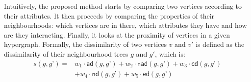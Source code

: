 Intuitively, the proposed method starts by comparing two vertices according to their attributes.
It then proceeds by comparing the properties of their neighbourhoods: which vertices are in there, which attributes they have and how are they interacting. 
Finally, it looks at the proximity of vertices in a given hypergraph.
Formally, the dissimilarity of two vertices $v$ and $v'$ is defined as the dissimilarity of their neighbourhood trees $g$ and $g'$, which is:
\begin{equation}
\label{eq:Sim}
\begin{split}
s(g,g’) = & w_1 \cdot \mathsf{ad}(g,g’) + w_2 \cdot \mathsf{nad}(g,g’) + w_3 \cdot \mathsf{cd}(g,g’) \\
     & + w_4 \cdot \mathsf{nd}(g,g’) + w_5 \cdot \mathsf{ed}(g,g’) 
 \end{split}
\end{equation}

